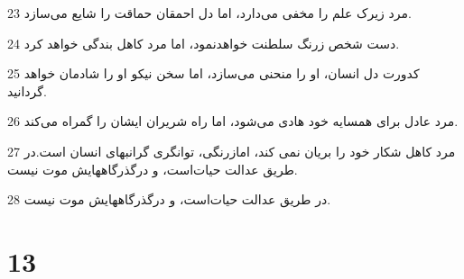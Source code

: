 \par 23 مرد زیرک علم را مخفی می‌دارد، اما دل احمقان حماقت را شایع می‌سازد.
\par 24 دست شخص زرنگ سلطنت خواهدنمود، اما مرد کاهل بندگی خواهد کرد.
\par 25 کدورت دل انسان، او را منحنی می‌سازد، اما سخن نیکو او را شادمان خواهد گردانید.
\par 26 مرد عادل برای همسایه خود هادی می‌شود، اما راه شریران ایشان را گمراه می‌کند.
\par 27 مرد کاهل شکار خود را بریان نمی کند، امازرنگی، توانگری گرانبهای انسان است.در طریق عدالت حیات‌است، و درگذرگاههایش موت نیست.
\par 28 در طریق عدالت حیات‌است، و درگذرگاههایش موت نیست.
 
\chapter{13}

